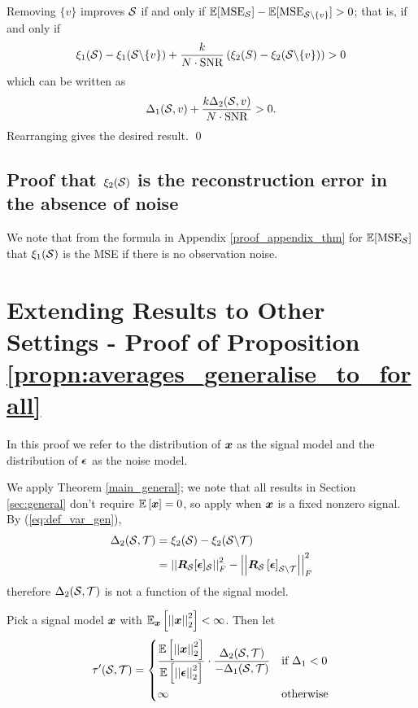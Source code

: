\noindent Removing $\{v\}$ improves $\mathcal{S}$ if and only if $\mathbb{E}[\text{MSE}_{\mathcal{S}}] - \mathbb{E}[\text{MSE}_{\mathcal{S} \backslash \{v\}}] > 0$; that is, if and only if
\[
    \xi_{1}(\mathcal{S}) - \xi_{1}(\mathcal{S} \backslash \{v\}) + \frac{k}{N \cdot \text{SNR}} \left( \xi_{2}(S) - \xi_{2}(\mathcal{S} \backslash \{v\}) \right) > 0 
    \] which can be written as
    \[\Delta_{1}(\mathcal{S},v) + \frac{k \Delta_{2}(\mathcal{S},v)}{N \cdot \text{SNR}} > 0.
    \]
Rearranging gives the desired result. \qed


\subsection{Proof that $\xi_2(\mathcal{S})$ is the reconstruction error in the absence of noise}
\label{proof_appendix_noiseless}
We note that from the formula in Appendix \ref{proof_appendix_thm} for $\mathbb{E}[\text{MSE}_{\mathcal{S}}]$ that $\xi_{1}(\mathcal{S})$ is the MSE if there is no observation noise.
\fi

\section{Extending Results to Other Settings - Proof of Proposition \ref{propn:averages_generalise_to_forall}}
\label{app:every_x}
In this proof we refer to the distribution of $\bm{x}$ as the signal model and the distribution of $\bm{\epsilon}$ as the noise model.

We apply Theorem \ref{main_general}; we note that all results in Section \ref{sec:general} don't require $\expect{\vect{x}} = 0$, so apply when $\bm{x}$ is a fixed nonzero signal.  By (\ref{eq:def_var_gen}),
\begin{align}
    \Delta_{2}(\set{S},\set{T}) &= \xi_{2}(\set{S}) - \xi_{2}(\set{S} \backslash \set{T}) \\
    &= \sqfrob{\matr{R}_{\set{S}}\vectsub[S]{\epsilon}} - \sqfrob{\matr{R}_{\set{S}}\msubgen[\set{S} \backslash \set{T}]{\vect{\epsilon}}}
\end{align}
therefore $\Delta_{2}(\mathcal{S},\mathcal{T})$ is not a function of the signal model. %

Pick a signal model $\bm{x}$ with  $\expect[\vect{x}]{\sqnormvec{\vect{x}}} < \infty$. Then let
\begin{align}
    \tau'(\set{S},\set{T}) = \begin{dcases}
  \frac{\expect{\sqnormvec{\vect{x}}}} {\expect{\sqnormvec{\vect{\epsilon}}}} \cdot \frac{\Delta_2(\set{S}, \set{T})}{- \Delta_1(\set{S}, \set{T})}  &\text{if }\Delta_{1} < 0 \\
    \infty &\text{otherwise} 
    \end{dcases}
\end{align}

